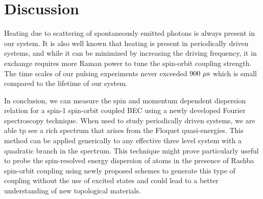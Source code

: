 \section{Discussion}


Heating due to scattering of spontaneously emitted photons is always present in our system. It is also well known that heating is present in periodically driven systems, and while it can be minimized by increasing the driving frequency, it in exchange requires more Raman power to tune the spin-orbit coupling strength. The time scales of our pulsing experiments never exceeded $900{\ \mu{\rm s}}$ which is small compared to the lifetime of our system.

In conclusion, we can measure the spin and momentum dependent dispersion relation for a spin-1 spin-orbit coupled BEC using a newly developed Fourier spectroscopy technique. When used to study periodically driven systems, we are able tp see a rich spectrum that arises from the Floquet quasi-energies. This method can be applied generically to any effective three level system with a quadratic branch in the spectrum. This technique might prove particularly useful to probe the spin-resolved energy dispersion of atoms in the presence of Rashba spin-orbit coupling using newly proposed schemes to generate this type of coupling without the use of excited states \cite{campbell_rashba_2016} and could lead to a better understanding of new topological materials.
